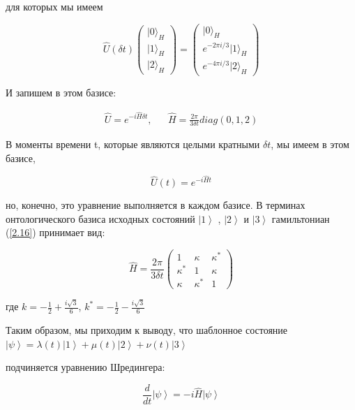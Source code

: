 \documentclass[main.tex]{subfiles}
\begin{document}
для которых мы имеем

\begin{equation}\label{2.15}
	\hat U(\delta t)\left(\begin{array}{c}{|0\rangle_{H}} \\ {|1\rangle_{H}} \\ {|2\rangle_{H}}\end{array}\right)=\left(\begin{array}{c}{|0\rangle_{H}} \\ {e^{-2 \pi i / 3}|1\rangle_{H}} \\ {e^{-4 \pi i / 3}|2\rangle_{H}}\end{array}\right)
\end{equation}

И запишем в этом базисе:

\begin{align}\label{2.16}
	\hat U = e^{-i\hat H\delta t}, && 
	\hat H =\frac{2\pi}{3\delta t} diag(0,1,2)
\end{align}

В моменты времени t, которые являются целыми кратными $\delta t$, мы имеем в этом базисе,

\begin{equation}\label{2.17}
	\hat U(t) = e^{-i\hat H t}
\end{equation}

но, конечно, это уравнение выполняется в каждом базисе. В терминах онтологического базиса исходных состояний $\left|1\right>$ , $\left|2\right>$ и $\left|3\right>$ гамильтониан (\ref{2.16}) принимает вид:

\begin{equation}\label{2.18}
	\hat H=\frac{2 \pi}{3 \delta t}\left(\begin{array}{ccc}{1} & {\kappa} & {\kappa^{*}} \\ {\kappa^{*}} & {1} & {\kappa} \\ {\kappa} & {\kappa^{*}} & {1}\end{array}\right)
\end{equation}

где $k = -\frac 1 2 + \frac{i\sqrt 3}{6}$, $k^* = -\frac 1 2-\frac{i\sqrt 3}{6}$

Таким образом, мы приходим к выводу, что шаблонное состояние $\left|\psi\right> = \lambda(t)\left|1\right> + \mu(t)\left|2\right> + \nu(t)\left|3\right>$

подчиняется уравнению Шредингера:

\begin{equation}\label{2.19}
	\frac d {dt} \left|\psi\right> = -i \hat H \left|\psi\right> 
\end{equation}
\end{document}
